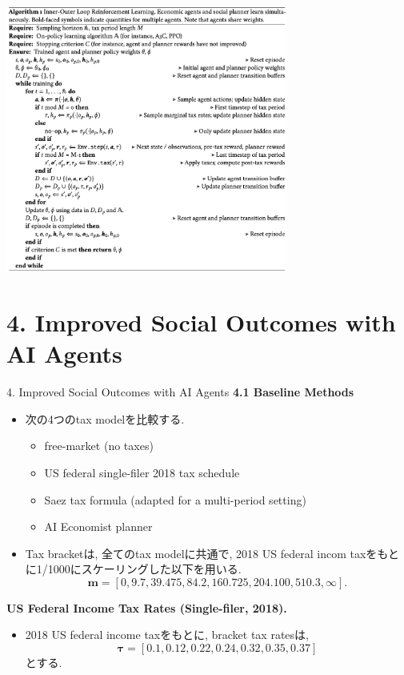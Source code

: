 \documentclass[unicode,aspectratio=169,11pt]{beamer}
\begin{document}
\begin{frame}
    \begin{center}
        \includegraphics[width=9.3cm]{algorithm1.png}
    \end{center}
\end{frame}

\section{4. Improved Social Outcomes with AI Agents}
\begin{frame}{4. Improved Social Outcomes with AI Agents}{}
{\large\bf 4.1 Baseline Methods}
\begin{itemize}
    \item 次の4つのtax modelを比較する.
    \begin{itemize}
        \item free-market (no taxes)
        \item US federal single-filer 2018 tax schedule
        \item Saez tax formula (adapted for a multi-period setting)
        \item AI Economist planner
    \end{itemize}
    \item Tax bracketは, 全てのtax modelに共通で, 2018 US federal incom taxをもとに1/1000にスケーリングした以下を用いる.
    \[ \bm{m} = [0, 9.7, 39.475, 84.2, 160.725, 204.100, 510.3, \infty]. \tag{15} \]
\end{itemize}
\end{frame}

\begin{frame}{}{}
{\bf US Federal Income Tax Rates (Single-filer, 2018).}
\begin{itemize}
    \item 2018 US federal income taxをもとに, bracket tax ratesは, 
    \[ \bm{\tau} = [0.1, 0.12, 0.22, 0.24, 0.32, 0.35, 0.37] \tag{16} \]
    とする.
\end{itemize}    
\end{frame}
\end{document}
